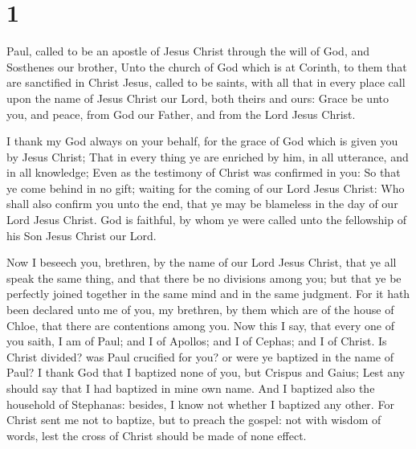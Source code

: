 \hypertarget{section}{%
\section{1}\label{section}}

 Paul, called to be an apostle of Jesus Christ through the
will of God, and Sosthenes our brother,  Unto the church of
God which is at Corinth, to them that are sanctified in Christ Jesus,
called to be saints, with all that in every place call upon the name of
Jesus Christ our Lord, both theirs and ours:  Grace be unto
you, and peace, from God our Father, and from the Lord Jesus Christ.

 I thank my God always on your behalf, for the grace of God
which is given you by Jesus Christ;  That in every thing ye
are enriched by him, in all utterance, and in all knowledge;
 Even as the testimony of Christ was confirmed in you:
 So that ye come behind in no gift; waiting for the coming
of our Lord Jesus Christ:  Who shall also confirm you unto
the end, that ye may be blameless in the day of our Lord Jesus Christ.
 God is faithful, by whom ye were called unto the fellowship
of his Son Jesus Christ our Lord.

 Now I beseech you, brethren, by the name of our Lord Jesus
Christ, that ye all speak the same thing, and that there be no divisions
among you; but that ye be perfectly joined together in the same mind and
in the same judgment.  For it hath been declared unto me of
you, my brethren, by them which are of the house of Chloe, that there
are contentions among you.  Now this I say, that every one
of you saith, I am of Paul; and I of Apollos; and I of Cephas; and I of
Christ.  Is Christ divided? was Paul crucified for you? or
were ye baptized in the name of Paul?  I thank God that I
baptized none of you, but Crispus and Gaius;  Lest any
should say that I had baptized in mine own name.  And I
baptized also the household of Stephanas: besides, I know not whether I
baptized any other.  For Christ sent me not to baptize, but
to preach the gospel: not with wisdom of words, lest the cross of Christ
should be made of none effect.

